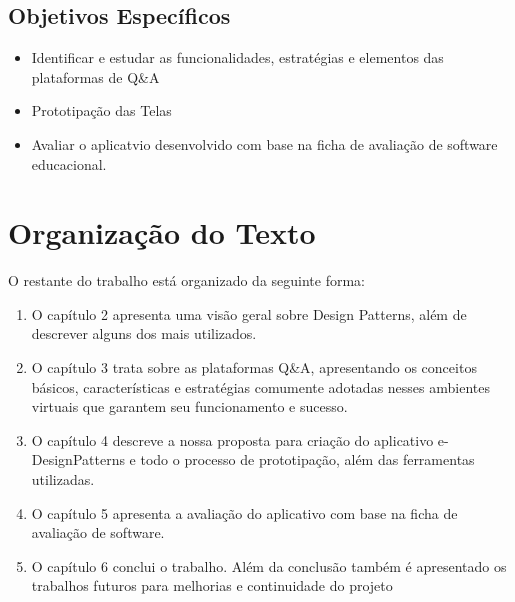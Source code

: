 \subsection{Objetivos Específicos}
\begin{itemize}
	\item Identificar e estudar as funcionalidades, estratégias e elementos das plataformas de Q\&A
	\item Prototipação das Telas
	\item Avaliar o aplicatvio desenvolvido com base na ficha de avaliação de software educacional.
	
\end{itemize}


\section{Organização do Texto}%

O restante do trabalho está organizado da seguinte forma:

\begin{enumerate}
	\item O capítulo 2 apresenta uma visão geral sobre Design Patterns, além de descrever alguns dos mais utilizados.
	\item O capítulo 3 trata sobre as plataformas Q\&A, apresentando os conceitos básicos, características e estratégias comumente adotadas nesses ambientes virtuais que garantem seu funcionamento e sucesso.
	\item O capítulo 4 descreve a nossa proposta para criação do aplicativo e-DesignPatterns e todo o processo de prototipação, além das ferramentas utilizadas.
	\item O capítulo 5 apresenta a avaliação do aplicativo com base na ficha de avaliação de software.
	\item O capítulo 6 conclui o trabalho. Além da conclusão também é apresentado os trabalhos futuros para melhorias e continuidade do projeto
\end{enumerate}





